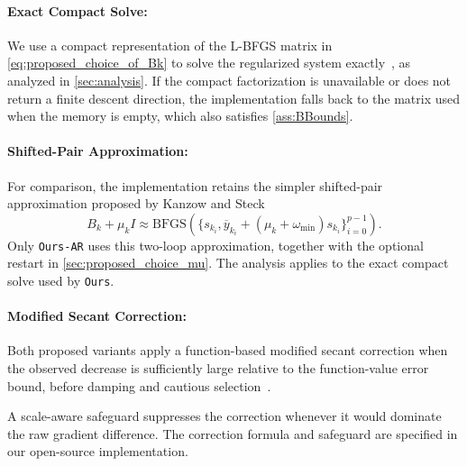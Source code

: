 \documentclass[journal_revised_MPC]{subfiles}
\begin{document}
\begin{MPCchange}
\paragraph{Exact Compact Solve: }

We use a compact representation of the L-BFGS matrix in \cref{eq:proposed_choice_of_Bk} to solve the regularized system exactly~\citep{kanzowRegularizationLimitedMemory2023}, as analyzed in \cref{sec:analysis}.
If the compact factorization is unavailable or does not return a finite descent direction, the implementation falls back to the matrix used when the memory is empty, which also satisfies \cref{ass:BBounds}.
\end{MPCchange}

\paragraph{Shifted-Pair Approximation: }

For comparison, the implementation retains the simpler shifted-pair approximation proposed by Kanzow and Steck~\citep{kanzowRegularizationLimitedMemory2023}
\begin{equation}\label{eq:approx_computation_of_regularized_quasi_Newton}
    B_k+\mu_k I
    \approx\mathrm{BFGS}(\{s_{k_i},\overline y_{k_i}+(\mu_k+\omega_{\min})s_{k_i}\}_{i=0}^{p-1}).
\end{equation}
Only \texttt{Ours-AR} uses this two-loop approximation, together with the optional restart in \cref{sec:proposed_choice_mu}.
The analysis applies to the exact compact solve used by \texttt{Ours}.

\begin{MPCchange}
\paragraph{Modified Secant Correction: }

Both proposed variants apply a function-based modified secant correction when the observed decrease is sufficiently large relative to the function-value error bound, before damping and cautious selection~\citep{zhangNewQuasiNewtonEquation1999,yuanConvergenceAnalysisModified2010}.
\end{MPCchange}
A scale-aware safeguard suppresses the correction whenever it would dominate the raw gradient difference.
The correction formula and safeguard are specified in our open-source implementation.
\end{document}

